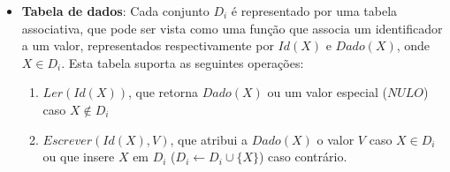 \documentclass[11pt,twoside,a4paper]{book}
\begin{document}
\begin{itemize}

    \item \textbf{Tabela de dados}: Cada conjunto \(D_i\) é representado por uma tabela associativa, que pode ser vista como uma função que associa um identificador a um valor, representados respectivamente por \(Id(X)\) e \(Dado(X)\), onde \(X \in D_i\). Esta tabela suporta as seguintes operações:

    \begin{enumerate}
        \item $Ler(Id(X))$, que retorna $Dado(X)$ ou um valor especial ($NULO$) caso $X \notin D_i$

        \item $Escrever(Id(X), V)$, que atribui a $Dado(X)$ o valor $V$ caso $X \in D_i$ ou que insere $X$ em $D_i$ ($D_i \gets D_i \cup \{X\}$) caso contrário. 
    \end{enumerate}
 




\end{itemize}
\end{document}

